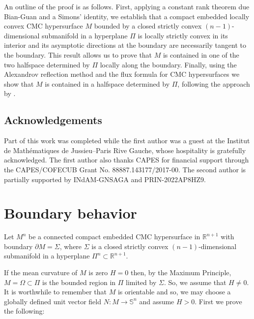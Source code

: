 \documentclass[11pt]{amsart}
\theoremstyle{plain}
\numberwithin{equation}{section}
\numberwithin{theorem}{section}
\begin{document}
An outline of the proof is as follows. First, applying a constant rank theorem due Bian-Guan \cite{BG1} and a Simons' identity, we establish that a compact embedded locally convex CMC hypersurface $M$ bounded by a closed strictly convex  $(n-1)$-dimensional submanifold in a hyperplane $\Pi$ is  locally strictly convex in its interior and its asymptotic directions at the boundary are necessarily tangent to the boundary. This result allows us to prove that $M$  is contained in one of the two halfspace determined by $\Pi$ locally along the boundary. Finally, using the Alexandrov reflection method and the flux formula for CMC hypersurfaces we show that $M$ is contained  in a halfspace determined by $\Pi$, following the approach by  \cite{BE91, BEMR91}.


\subsection* {Acknowledgements}

Part of this work was completed while the first author was a guest at the Institut de Mathématiques de Jussieu–Paris Rive Gauche, whose hospitality is gratefully acknowledged. The first author also thanks CAPES for financial support through the CAPES/COFECUB Grant No. 88887.143177/2017-00. The second author is partially supported by INdAM-GNSAGA and 
 PRIN-2022AP8HZ9.




\section{Boundary behavior}
\label{section2}


Let $M^n$ be a connected compact embedded CMC hypersurface in $\mathbb{R}^{n+1}$ with boundary $\partial M=\Sigma$, where $\Sigma$ is a closed strictly convex  $(n-1)$-dimensional submanifold in a hyperplane $\Pi^n\subset \mathbb{R}^{n+1}$. 

If the mean curvature of $M$ is zero $H=0$ then, by the Maximum Principle, $M=\Omega\subset \Pi$ is the bounded region in $\Pi$ limited by $\Sigma$. So, we assume that $H\neq 0$. It is worthwhile to remember that  $M$ is orientable and so, we may choose a globally defined unit vector field $N:M \rightarrow \mathbb{S}^n$ and assume $H>0$. 
First we prove the following:
\end{document}

